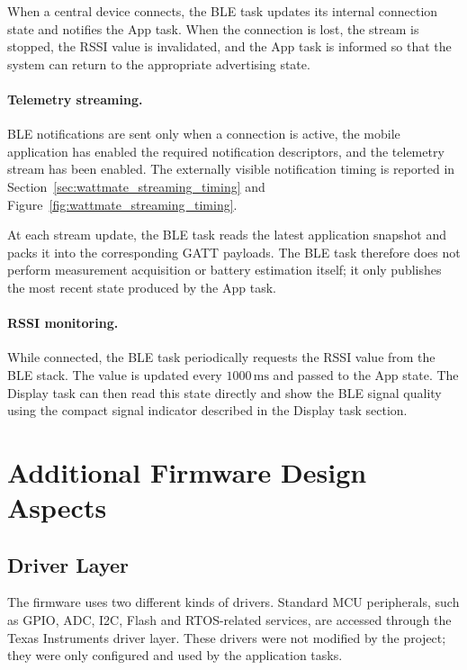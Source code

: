 When a central device connects, the BLE task updates its internal connection state and notifies the App task. 
When the connection is lost, the stream is stopped, the RSSI value is invalidated, and the App task is informed so that the system can return to the appropriate advertising state.

\paragraph{Telemetry streaming.}
BLE notifications are sent only when a connection is active, the mobile application has enabled the required notification descriptors, and the telemetry stream has been enabled. 
The externally visible notification timing is reported in Section~\ref{sec:wattmate_streaming_timing} and Figure~\ref{fig:wattmate_streaming_timing}.

At each stream update, the BLE task reads the latest application snapshot and packs it into the corresponding GATT payloads. 
The BLE task therefore does not perform measurement acquisition or battery estimation itself; it only publishes the most recent state produced by the App task.

\paragraph{RSSI monitoring.}
While connected, the BLE task periodically requests the RSSI value from the BLE stack. The value is updated every \(1000\,\mathrm{ms}\) and passed to the App state. The Display task can then read this state directly and show the BLE signal quality using the compact signal indicator described in the Display task section.






\section{Additional Firmware Design Aspects}
\subsection{Driver Layer}

The firmware uses two different kinds of drivers. Standard MCU peripherals, such as GPIO, ADC, I2C, Flash and RTOS-related services, are accessed through the Texas Instruments driver layer. These drivers were not modified by the project; they were only configured and used by the application tasks.

